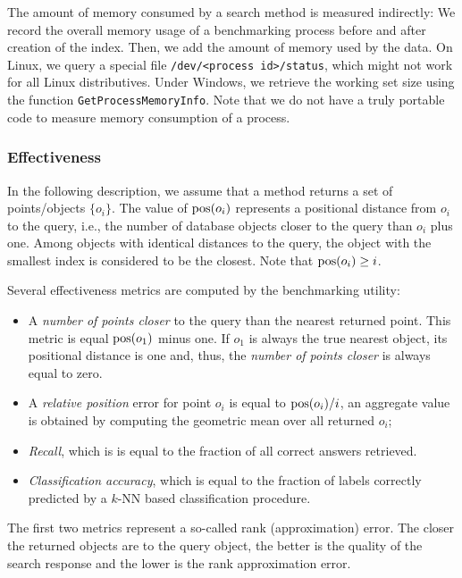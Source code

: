 \documentclass[runningheads,a4paper]{llncs}
\newcommand{\ttt}[1]{\texttt{#1}}
\newcommand{\knn}{$k$-NN }
\newcommand{\pos}{\mbox{\rm pos}}
\begin{document}
{The amount of memory consumed by a search method is measured indirectly: 
We record the overall memory usage of a benchmarking process before and after creation of the index. Then, we add the amount of memory used by the data.
On Linux,  we query a special file \ttt{/dev/<process id>/status},
which might not work for all Linux distributives.
Under Windows, we retrieve the working set size using the function
\ttt{GetProcessMemoryInfo}.
Note that we do not have  a truly portable code to measure memory consumption of a process.

\subsubsection{Effectiveness}
\label{SectionEffect}

In the following description, we assume that a method returns 
a set of points/objects $\{o_i\}$.
The value of $\pos(o_i)$ represents a positional distance from $o_i$ to the query, 
i.e., the number of database objects closer to the query than $o_i$ plus one.
Among objects with identical distances to the query, 
the object with the smallest index is considered to be the closest.
Note that $\pos(o_i) \ge i$.

Several effectiveness metrics are computed by the benchmarking utility:
\begin{itemize}
\item  A \emph{number of points closer} to the query than the nearest returned point.
This metric is equal $\pos(o_1)$ minus one. If $o_1$ is always the true nearest object,
its positional distance is one and, thus, the \emph{number of points closer} is always equal to zero.
\item A \emph{relative position} error for point $o_i$ is equal to $\pos(o_i)/i$,
an aggregate value is obtained by computing the geometric mean over all returned $o_i$;
\item \emph{Recall},  which is is equal to the fraction of all correct answers retrieved.
\item \emph{Classification accuracy}, which is equal to the fraction of labels correctly
predicted by a \knn based classification procedure.
\end{itemize}

The first two metrics represent a so-called rank (approximation) error.
The closer the returned objects are to the query object, 
the better is the quality of the search response and the lower is the rank 
approximation error.

}
\end{document}
